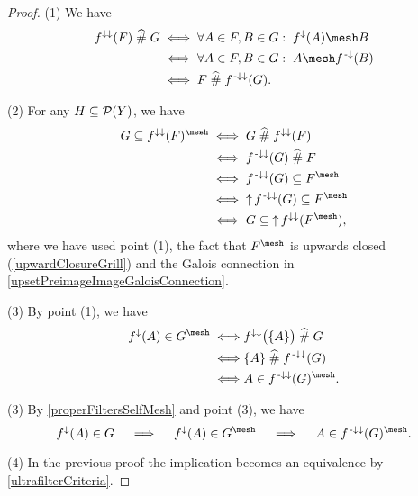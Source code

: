 \begin{proof}
(1) We have
\begin{align*}
f^{\imf\imf}(F) \amesh G &\iff \forall A\in F, B\in G:\; f^{\imf}(A) \mesh B \\
&\iff \forall A\in F, B\in G:\; A \mesh f^\preimf(B) \\
&\iff F \amesh f^{\preimf\imf}(G).
\end{align*}

(2) For any $H\subseteq \operatorname{\mathcal{P}}(Y)$, we have
\begin{align*}
G\subseteq f^{\imf\imf}(F)^\mesh &\iff G \amesh f^{\imf\imf}(F) \\
&\iff f^{\preimf\imf}(G)\amesh F \\
&\iff f^{\preimf\imf}(G) \subseteq F^\mesh \\
&\iff \upset f^{\preimf\imf}(G) \subseteq F^\mesh \\
&\iff G \subseteq \upset f^{\imf\imf}(F^\mesh),
\end{align*}
where we have used point (1), the fact that $F^\mesh$ is upwards closed (\ref{upwardClosureGrill}) and the Galois connection in \ref{upsetPreimageImageGaloisConnection}.

(3) By point (1), we have
\begin{align*}
f^\imf(A)\in G^\mesh \iff& f^{\imf\imf}\big(\{A\}\big)\amesh G \\
\iff& \{A\} \amesh f^{\preimf\imf}(G) \\
\iff& A \in f^{\preimf\imf}(G)^\mesh.
\end{align*}

(3) By \ref{properFiltersSelfMesh} and point (3), we have
\[ f^\imf(A)\in G \quad\implies\quad  f^\imf(A)\in G^\mesh \quad\implies\quad  A \in f^{\preimf\imf}(G)^\mesh. \]

(4) In the previous proof the implication becomes an equivalence by \ref{ultrafilterCriteria}.
\end{proof}

